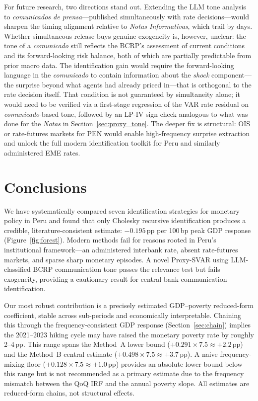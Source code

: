 \documentclass[12pt,letterpaper]{article}
\begin{document}
For future research, two directions stand out. Extending the LLM tone
analysis to \textit{comunicados de prensa}---published simultaneously
with rate decisions---would sharpen the timing alignment relative to
\textit{Notas Informativas}, which trail by days.
Whether simultaneous release buys genuine exogeneity is, however, unclear:
the tone of a \textit{comunicado} still reflects the BCRP's assessment of
current conditions and its forward-looking risk balance, both of which are
partially predictable from prior macro data.
The identification gain would require the forward-looking language in the
\textit{comunicado} to contain information about the \textit{shock}
component---the surprise beyond what agents had already priced in---that is
orthogonal to the rate decision itself.
That condition is not guaranteed by simultaneity alone; it would need to be
verified via a first-stage regression of the VAR rate residual on
\textit{comunicado}-based tone, followed by an LP-IV sign check analogous
to what was done for the \textit{Notas} in Section~\ref{sec:proxy_tone}. The deeper fix is structural: OIS or
rate-futures markets for PEN would enable high-frequency surprise
extraction and unlock the full modern identification toolkit for Peru
and similarly administered EME rates.

\section{Conclusions}
\label{sec:conclusion}

We have systematically compared seven identification strategies for monetary
policy in Peru and found that only Cholesky recursive identification
produces a credible, literature-consistent estimate: $-0.195$\,pp per
100\,bp peak GDP response (Figure~\ref{fig:forest}).
Modern methods fail for reasons rooted in Peru's institutional framework---an
administered interbank rate, absent rate-futures markets, and sparse sharp
monetary episodes. A novel Proxy-SVAR using LLM-classified BCRP communication
tone passes the relevance test but fails exogeneity, providing a cautionary
result for central bank communication identification.

Our most robust contribution is a precisely estimated GDP--poverty
reduced-form coefficient, stable across sub-periods and economically
interpretable. Chaining this through the frequency-consistent GDP
response (Section~\ref{sec:chain}) implies the 2021--2023 hiking
cycle may have raised the monetary poverty rate by roughly 2--4\,pp.
This range spans the Method~A lower bound
($+0.291\times7.5\approx+2.2$\,pp) and the Method~B central estimate
($+0.498\times7.5\approx+3.7$\,pp). A naive frequency-mixing floor
($+0.128\times7.5\approx+1.0$\,pp) provides an absolute lower bound
below this range but is not recommended as a primary estimate due to
the frequency mismatch between the QoQ IRF and the annual poverty slope.
All estimates are reduced-form chains, not structural effects.
\end{document}
